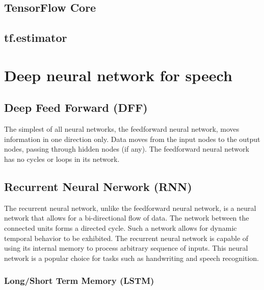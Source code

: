 \subsection{TensorFlow Core}


\subsection{tf.estimator}


\section{Deep neural network for speech}

\subsection{Deep Feed Forward (DFF)}
The simplest of all neural networks, the feedforward neural network, moves information in one direction only. Data moves from the input nodes to the output nodes, passing through hidden nodes (if any). The feedforward neural network has no cycles or loops in its network.

\subsection{Recurrent Neural Nerwork (RNN)}
The recurrent neural network, unlike the feedforward neural network, is a neural network that allows for a bi-directional flow of data. The network between the connected units forms a directed cycle. Such a network allows for dynamic temporal behavior to be exhibited. The recurrent neural network is capable of using its internal memory to process arbitrary sequence of inputs. This neural network is a popular choice for tasks such as handwriting and speech recognition.

\subsubsection{Long/Short Term Memory (LSTM)}
